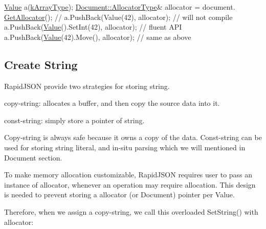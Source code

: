 \begin{DoxyCode}
\hyperlink{class_generic_value}{Value} a(\hyperlink{rapidjson_8h_a1d1cfd8ffb84e947f82999c682b666a7af41527d6925efa3c5c3dadb23dfef7c8}{kArrayType});
\hyperlink{class_generic_document_a35155b912da66ced38d22e2551364c57}{Document::AllocatorType}& allocator = document.
      \hyperlink{class_generic_document_aa4609d6b19f86aec1a6b96edf2c27686}{GetAllocator}();
\textcolor{comment}{// a.PushBack(Value(42), allocator);       // will not compile}
a.PushBack(\hyperlink{document_8h_a071cf97155ba72ac9a1fc4ad7e63d481}{Value}().SetInt(42), allocator); \textcolor{comment}{// fluent API}
a.PushBack(\hyperlink{document_8h_a071cf97155ba72ac9a1fc4ad7e63d481}{Value}(42).Move(), allocator);   \textcolor{comment}{// same as above}
\end{DoxyCode}
\hypertarget{md_Cadriciel_Commun_Externe_RapidJSON_doc_tutorial.zh-cn_CreateString}{}\subsection{Create String}\label{md_Cadriciel_Commun_Externe_RapidJSON_doc_tutorial.zh-cn_CreateString}
Rapid\+J\+S\+ON provide two strategies for storing string.


\begin{DoxyEnumerate}
\item copy-\/string\+: allocates a buffer, and then copy the source data into it.
\item const-\/string\+: simply store a pointer of string.
\end{DoxyEnumerate}

Copy-\/string is always safe because it owns a copy of the data. Const-\/string can be used for storing string literal, and in-\/situ parsing which we will mentioned in Document section.

To make memory allocation customizable, Rapid\+J\+S\+ON requires user to pass an instance of allocator, whenever an operation may require allocation. This design is needed to prevent storing a allocator (or Document) pointer per Value.

Therefore, when we assign a copy-\/string, we call this overloaded {\ttfamily Set\+String()} with allocator\+:




